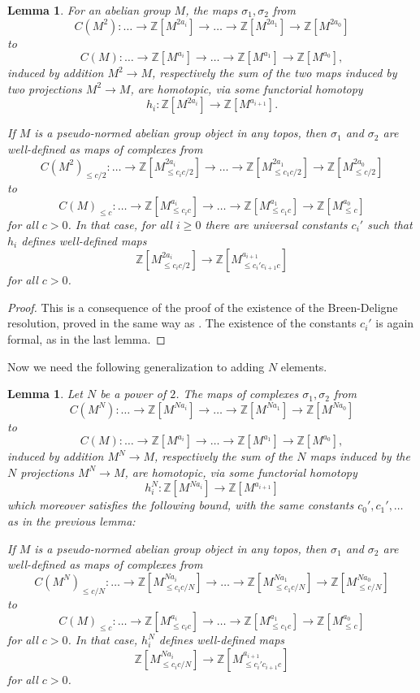 \documentclass[11pt]{amsart}
\numberwithin{equation}{section}
\numberwithin{theorem}{section}
\newtheorem{lemma}[theorem]{Lemma}
\theoremstyle{definition}
\begin{document}
\begin{lemma}\label{lem:basehomotopy} For an abelian group $M$, the maps $\sigma_1,\sigma_2$ from
\[
C(M^2): \ldots \to \mathbb Z[M^{2a_i}]\to\ldots\to\mathbb Z[M^{2a_1}]\to\mathbb Z[M^{2a_0}]
\]
to
\[
C(M): \ldots \to \mathbb Z[M^{a_i}]\to\ldots\to\mathbb Z[M^{a_1}]\to\mathbb Z[M^{a_0}],
\]
induced by addition $M^2\to M$, respectively the sum of the two maps induced by two projections $M^2\to M$, are homotopic, via some functorial homotopy
\[
h_i: \mathbb Z[M^{2a_i}]\to \mathbb Z[M^{a_{i+1}}].
\]

If $M$ is a pseudo-normed abelian group object in any topos, then $\sigma_1$ and $\sigma_2$ are well-defined as maps of complexes from
\[
C(M^2)_{\leq c/2}: \ldots \to \mathbb Z[M^{2a_i}_{\leq c_ic/2}]\to\ldots\to\mathbb
Z[M^{2a_1}_{\leq c_1c/2}]\to\mathbb Z[M^{2a_0}_{\leq c/2}]
\]
to
\[
C(M)_{\leq c}: \ldots \to \mathbb Z[M^{a_i}_{\leq c_ic}]\to\ldots\to\mathbb
Z[M^{a_1}_{\leq c_1c}]\to\mathbb Z[M^{a_0}_{\leq c}]
\]
for all $c>0$. In that case, for all $i\geq 0$ there are universal constants $c_i'$ such that $h_i$ defines well-defined maps
\[
\mathbb Z[M^{2a_i}_{\leq c_ic/2}]\to \mathbb Z[M^{a_{i+1}}_{\leq
c_i'c_{i+1}c}]
\]
for all $c>0$.
\end{lemma}

\begin{proof} This is a consequence of the proof of the existence of the Breen-Deligne resolution, proved in the same way as \cite[Proposition 4.17]{Condensed}. The existence of the constants $c_i'$ is again formal, as in the last lemma.
\end{proof}

Now we need the following generalization to adding $N$ elements.

\begin{lemma}\label{lem:homotopyNelements} Let $N$ be a power of $2$. The maps of complexes $\sigma_1,\sigma_2$ from
\[
C(M^N): \ldots \to \mathbb Z[M^{Na_i}]\to\ldots\to\mathbb Z[M^{Na_1}]\to\mathbb Z[M^{Na_0}]
\]
to
\[
C(M): \ldots \to \mathbb Z[M^{a_i}]\to\ldots\to\mathbb Z[M^{a_1}]\to\mathbb Z[M^{a_0}],
\]
induced by addition $M^N\to M$, respectively the sum of the $N$ maps induced by the $N$ projections $M^N\to M$, are homotopic, via some functorial homotopy
\[
h_i^N: \mathbb Z[M^{Na_i}]\to \mathbb Z[M^{a_{i+1}}]
\]
which moreover satisfies the following bound, with the same constants $c_0',c_1',\ldots$ as in the previous lemma:

If $M$ is a pseudo-normed abelian group object in any topos, then $\sigma_1$ and $\sigma_2$ are well-defined as maps of complexes from
\[
C(M^N)_{\leq c/N}: \ldots \to \mathbb Z[M^{Na_i}_{\leq c_ic/N}]\to\ldots\to\mathbb Z[M^{Na_1}_{\leq c_1c/N}]\to\mathbb Z[M^{Na_0}_{\leq c/N}]
\]
to
\[
C(M)_{\leq c}: \ldots \to \mathbb Z[M^{a_i}_{\leq c_ic}]\to\ldots\to\mathbb Z[M^{a_1}_{\leq c_1c}]\to\mathbb Z[M^{a_0}_{\leq c}]
\]
for all $c>0$. In that case, $h_i^N$ defines well-defined maps
\[
\mathbb Z[M^{Na_i}_{\leq c_ic/N}]\to \mathbb Z[M^{a_{i+1}}_{\leq c_i'c_{i+1}c}]
\]
for all $c>0$.
\end{lemma}
\end{document}
